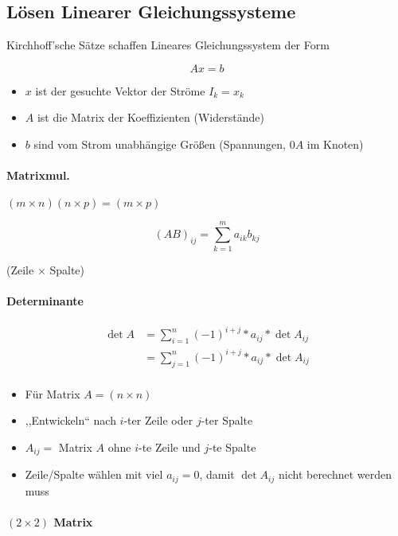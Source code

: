 \subsection{Lösen Linearer Gleichungssysteme}

Kirchhoff'sche Sätze schaffen Lineares Gleichungssystem der Form

$$A x = b$$

\begin{itemize}
  \item $x$ ist der gesuchte Vektor der Ströme $I_k = x_k$
  \item $A$ ist die Matrix der Koeffizienten (Widerstände)
  \item $b$ sind vom Strom unabhängige Grö\ss en (Spannungen, $0A$ im Knoten)
\end{itemize}

\paragraph{Matrixmul.}
$(m \times n)(n \times p) = (m \times p)$

\begin{mzImportant}
  $$(AB)_{ij} = \sum_{k=1}^m a_{ik}b_{kj}$$

  (Zeile $\times$ Spalte)
\end{mzImportant}

\paragraph{Determinante}

\begin{align*}
  \det A & = \sum_{i=1}^n (-1)^{i + j} * a_{ij} * \det A_{ij} \\
         & = \sum_{j=1}^n (-1)^{i + j} * a_{ij} * \det A_{ij} \\
\end{align*}

\begin{itemize}
  \item Für Matrix $A = (n \times n)$
  \item ,,Entwickeln`` nach $i$-ter Zeile oder $j$-ter Spalte
  \item $A_{ij} =$ Matrix $A$ ohne $i$-te Zeile und $j$-te Spalte
  \item Zeile/Spalte wählen mit viel $a_{ij} = 0$, damit $\det A_{ij}$ nicht berechnet werden muss
\end{itemize}

\paragraph{$(2 \times 2)$ Matrix}

